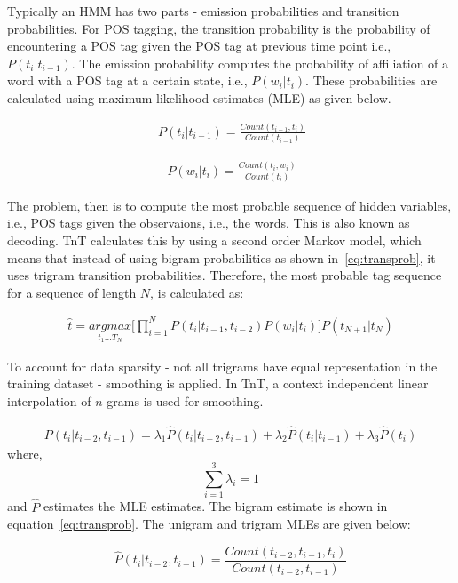 Typically an HMM has two parts - emission probabilities and transition probabilities. For POS tagging, the transition probability is the probability of encountering a POS tag given the POS tag at previous time point i.e.,  $P(t_i|t_{i-1})$. The emission probability computes the probability of affiliation of a word with a POS tag at a certain state, i.e., $P(w_i|t_i)$. These probabilities are calculated using maximum likelihood estimates (MLE) as given below.

\begin{align}~\label{eq:transprob}
    P(t_i|t_{i-1}) = \frac{Count(t_{i-1},t_i)}{Count(t_{i-1})} 
\end{align}

\begin{align}~\label{eq:emprob}
    P(w_i|t_i) = \frac{Count(t_i,w_i)}{Count(t_i)}
\end{align}
    
The problem, then is to compute the most probable sequence of hidden variables, i.e., POS tags given the observaions, i.e., the words. This is also known as decoding. TnT calculates this by using a second order Markov model, which means that instead of using bigram probabilities as shown in~\ref{eq:transprob}, it uses trigram transition probabilities. Therefore, the most probable tag sequence for a sequence of length $N$, is calculated as:

\begin{align}
    \hat{t} = \underset{t_1 ... T_N}{argmax}  \bigg [ \prod_{i=1}^N P(t_i|t_{i-1},t_{i-2}) P(w_i|t_i) \bigg] P(t_{N+1}|t_N)
\end{align}

To account for data sparsity - not all trigrams have equal representation in the training dataset - smoothing is applied. In TnT, a context independent linear interpolation of $n$-grams is used for smoothing.

\begin{align}
    P(t_i|t_{i-2},t_{i-1}) = \lambda_1 \hat{P}(t_i|t_{i-2},t_{i-1}) + \lambda_2 \hat{P}(t_i|t_{i-1}) + \lambda_3 \hat{P}(t_i)
\end{align}
where, $$\sum_{i=1}^3 \lambda_i = 1$$
and $\hat{P}$ estimates the MLE estimates. The bigram estimate is shown in equation~\ref{eq:transprob}. The unigram and trigram MLEs are given below:

\begin{equation}
    \hat{P}(t_i|t_{i-2},t_{i-1}) = \frac{Count(t_{i-2},t_{i-1},t_i)}{Count(t_{i-2},t_{i-1})}
\end{equation}

